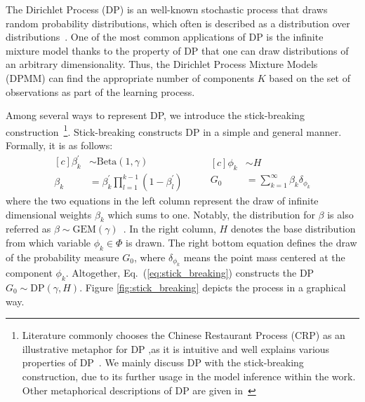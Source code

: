 \documentclass{article}
\begin{document}
The Dirichlet Process (DP) is an well-known stochastic process that draws random probability distributions, which often is described as a distribution over distributions~\cite{DBLP:reference/ml/Teh17}. One of the most common applications of DP is the infinite mixture model thanks to the property of DP that one can draw distributions of an arbitrary dimensionality. Thus, the Dirichlet Process Mixture Models (DPMM) can find the appropriate number of components $K$ based on the set of observations as part of the learning process.

Among several ways to represent DP, we introduce the stick-breaking construction~\cite{sethuraman94}\footnote{Literature commonly chooses the Chinese Restaurant Process (CRP) as an illustrative metaphor for DP ,as it is intuitive and well explains various properties of DP~\cite{DBLP:reference/ml/Teh17}. We mainly discuss DP with the stick-breaking construction, due to its further usage in the model inference within the work. Other metaphorical descriptions of DP are given in~\cite{DBLP:reference/ml/Teh17, DBLP:conf/ismir/HoffmanBC08}}.
Stick-breaking constructs DP in a simple and general manner. Formally, it is as follows:
\begin{equation}\label{eq:stick_breaking}
\begin{aligned}[c]
    \beta^{\prime}_{k} &\sim \text{Beta}(1, \gamma) \\
    \beta_{k} &= \beta^{\prime}_{k} \prod_{l=1}^{k-1} (1 - \beta_{l}^{\prime})
\end{aligned}
\qquad
\begin{aligned}[c]
    \phi_{k} &\sim H \\
    G_{0} &= \sum^{\infty}_{k=1} \beta_{k}\delta_{\phi_{k}}
\end{aligned}
\end{equation}
where the two equations in the left column represent the draw of infinite dimensional weights $\beta_{k}$ which sums to one. Notably, the distribution for $\beta$ is also referred as $\beta \sim \text{GEM}(\gamma)$~\cite{DBLP:journals/cpc/Pitman02}. In the right column, $H$ denotes the base distribution from which variable $\phi_{k}\in\Phi$ is drawn. The right bottom equation defines the draw of the probability measure $G_{0}$, where $\delta_{\phi_{k}}$ means the point mass centered at the component $\phi_{k}$. Altogether, Eq.\ (\ref{eq:stick_breaking}) constructs the DP $G_{0} \sim \text{DP}(\gamma, H)$. Figure \ref{fig:stick_breaking} depicts the process in a graphical way.
\end{document}
